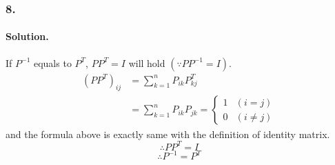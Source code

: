 \subsubsection{8.}
\paragraph*{Solution.}
If $P^{-1}$ equals to $P^T$, $PP^T=I$ will hold $(\because PP^{-1}=I)$.
\begin{align*}
    (PP^T)_{ij} &= \sum^n_{k=1}P_{ik}P^T_{kj}\\
    &= \sum^n_{k=1}P_{ik}P_{jk} = \begin{cases} 1 & (i = j) \\ 0 & (i \neq j) \end{cases}
\end{align*}
and the formula above is exactly same with the definition of identity matrix.
$$\therefore PP^T = I$$
$$\therefore P^{-1} = P^T$$
